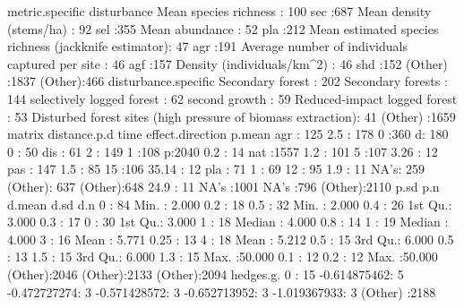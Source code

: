 \documentclass[11pt, a4paper]{article}
\begin{document}
\begin{Schunk}
\begin{Soutput}
                                              metric.specific  disturbance 
 Mean species richness                                : 100   sec    :687  
 Mean density (stems/ha)                              :  92   sel    :355  
 Mean abundance                                       :  52   pla    :212  
 Mean estimated species richness (jackknife estimator):  47   agr    :191  
 Average number of individuals captured per site      :  46   agf    :157  
 Density (individuals/km^2)                           :  46   shd    :152  
 (Other)                                              :1837   (Other):466  
                                                   disturbance.specific
 Secondary forest                                            : 202     
 Secondary forests                                           : 144     
 selectively logged forest                                   :  62     
 second growth                                               :  59     
 Reduced-impact logged forest                                :  53     
 Disturbed forest sites (high pressure of biomass extraction):  41     
 (Other)                                                     :1659     
  matrix      distance.p.d       time     effect.direction     p.mean    
 agr : 125   2.5    : 178   0      :360   d: 180           0      :  50  
 dis :  61   2      : 149   1      :108   p:2040           0.2    :  14  
 nat :1557   1.2    : 101   5      :107                    3.26   :  12  
 pas : 147   1.5    :  85   15     :106                    35.14  :  12  
 pla :  71   1      :  69   12     : 95                    1.9    :  11  
 NA's: 259   (Other): 637   (Other):648                    24.9   :  11  
             NA's   :1001   NA's   :796                    (Other):2110  
      p.sd           p.n             d.mean          d.sd           d.n        
 0      :  84   Min.   : 2.000   0.2    :  18   0.5    :  32   Min.   : 2.000  
 0.4    :  26   1st Qu.: 3.000   0.3    :  17   0      :  30   1st Qu.: 3.000  
 1      :  18   Median : 4.000   0.8    :  14   1      :  19   Median : 4.000  
 3      :  16   Mean   : 5.771   0.25   :  13   4      :  18   Mean   : 5.212  
 0.5    :  15   3rd Qu.: 6.000   0.5    :  13   1.5    :  15   3rd Qu.: 6.000  
 1.3    :  15   Max.   :50.000   0.1    :  12   0.2    :  12   Max.   :50.000  
 (Other):2046                    (Other):2133   (Other):2094                   
        hedges.g.   
 0           :  15  
 -0.614875462:   5  
 -0.472727274:   3  
 -0.571428572:   3  
 -0.652713952:   3  
 -1.019367933:   3  
 (Other)     :2188  
\end{Soutput}

\end{Schunk}
\end{document}
